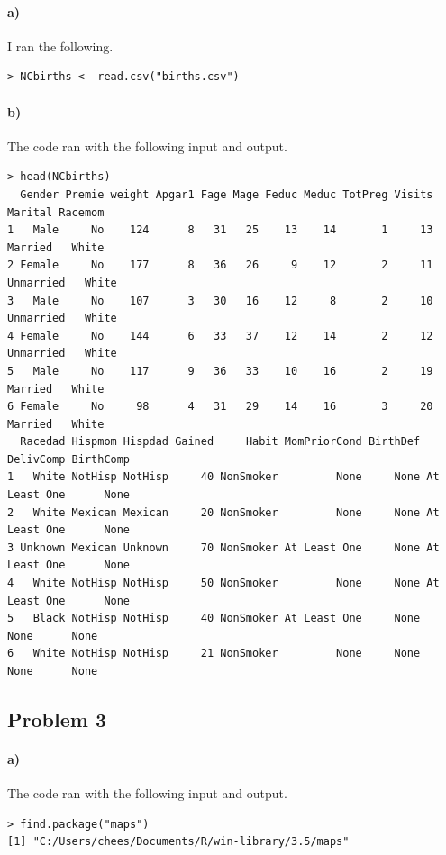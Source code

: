 \documentclass[12pt]{article}
\begin{document}
\paragraph{a)}

I ran the following.
\begin{verbatim}
> NCbirths <- read.csv("births.csv")
\end{verbatim}

\paragraph{b)}

The code ran with the following input and output.
\scriptsize
\begin{verbatim}
> head(NCbirths)
  Gender Premie weight Apgar1 Fage Mage Feduc Meduc TotPreg Visits   Marital Racemom
1   Male     No    124      8   31   25    13    14       1     13   Married   White
2 Female     No    177      8   36   26     9    12       2     11 Unmarried   White
3   Male     No    107      3   30   16    12     8       2     10 Unmarried   White
4 Female     No    144      6   33   37    12    14       2     12 Unmarried   White
5   Male     No    117      9   36   33    10    16       2     19   Married   White
6 Female     No     98      4   31   29    14    16       3     20   Married   White
  Racedad Hispmom Hispdad Gained     Habit MomPriorCond BirthDef    DelivComp BirthComp
1   White NotHisp NotHisp     40 NonSmoker         None     None At Least One      None
2   White Mexican Mexican     20 NonSmoker         None     None At Least One      None
3 Unknown Mexican Unknown     70 NonSmoker At Least One     None At Least One      None
4   White NotHisp NotHisp     50 NonSmoker         None     None At Least One      None
5   Black NotHisp NotHisp     40 NonSmoker At Least One     None         None      None
6   White NotHisp NotHisp     21 NonSmoker         None     None         None      None
\end{verbatim}
\normalsize

\subsection*{Problem 3}

\paragraph{a)}

The code ran with the following input and output.
\begin{verbatim}
> find.package("maps")
[1] "C:/Users/chees/Documents/R/win-library/3.5/maps"
\end{verbatim}
\end{document}

